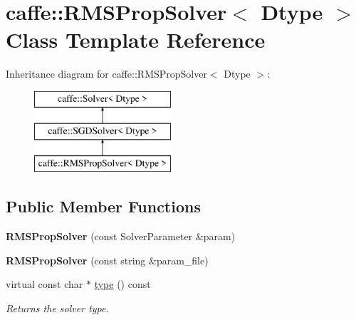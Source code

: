 \hypertarget{classcaffe_1_1RMSPropSolver}{}\section{caffe\+:\+:R\+M\+S\+Prop\+Solver$<$ Dtype $>$ Class Template Reference}
\label{classcaffe_1_1RMSPropSolver}
Inheritance diagram for caffe\+:\+:R\+M\+S\+Prop\+Solver$<$ Dtype $>$\+:\begin{figure}[H]
\begin{center}
\leavevmode
\includegraphics[height=3.000000cm]{classcaffe_1_1RMSPropSolver}
\end{center}
\end{figure}
\subsection*{Public Member Functions}
\begin{DoxyCompactItemize}
\item 
{\bfseries R\+M\+S\+Prop\+Solver} (const Solver\+Parameter \&param)\hypertarget{classcaffe_1_1RMSPropSolver_a6812979d38db698476698cfa344ff014}{}\label{classcaffe_1_1RMSPropSolver_a6812979d38db698476698cfa344ff014}

\item 
{\bfseries R\+M\+S\+Prop\+Solver} (const string \&param\+\_\+file)\hypertarget{classcaffe_1_1RMSPropSolver_a2f2f116bf48c2e3ddab4100467893075}{}\label{classcaffe_1_1RMSPropSolver_a2f2f116bf48c2e3ddab4100467893075}

\item 
virtual const char $\ast$ \hyperlink{classcaffe_1_1RMSPropSolver_a08f4f94bce1b888215943363e007f8de}{type} () const \hypertarget{classcaffe_1_1RMSPropSolver_a08f4f94bce1b888215943363e007f8de}{}\label{classcaffe_1_1RMSPropSolver_a08f4f94bce1b888215943363e007f8de}

\begin{DoxyCompactList}\small\item\em Returns the solver type. \end{DoxyCompactList}\end{DoxyCompactItemize}
